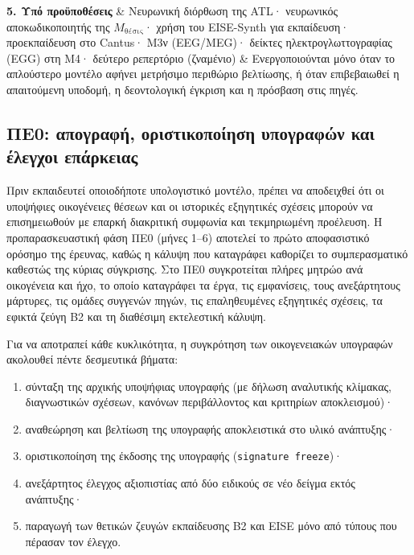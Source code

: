 \documentclass[11pt,a4paper]{article}
\begin{document}
\begin{longtable}[]
\textbf{5. Υπό προϋποθέσεις} & Νευρωνική διόρθωση της ATL· νευρωνικός αποκωδικοποιητής της \(M_{\text{θέσις}}\)· χρήση του EISE-Synth για εκπαίδευση· προεκπαίδευση στο Cantus· Μ3ν (EEG/MEG)· δείκτες ηλεκτρογλωττογραφίας (EGG) στη Μ4· δεύτερο ρεπερτόριο (ζναμένιο) & Ενεργοποιούνται μόνο όταν το απλούστερο μοντέλο αφήνει μετρήσιμο περιθώριο βελτίωσης, ή όταν επιβεβαιωθεί η απαιτούμενη υποδομή, η δεοντολογική έγκριση και η πρόσβαση στις πηγές. \\
\end{longtable}

\subsection{ΠΕ0: απογραφή, οριστικοποίηση υπογραφών και έλεγχοι επάρκειας}\label{ux3c0ux3b50-ux3b1ux3c0ux3bfux3b3ux3c1ux3b1ux3c6ux3ae-ux3c0ux3acux3b3ux3c9ux3bcux3b1-ux3c5ux3c0ux3bfux3b3ux3c1ux3b1ux3c6ux3ceux3bd-ux3baux3b1ux3b9-ux3c0ux3cdux3bbux3b5ux3c2-ux3b5ux3c0ux3acux3c1ux3baux3b5ux3b9ux3b1ux3c2}

Πριν εκπαιδευτεί οποιοδήποτε υπολογιστικό μοντέλο, πρέπει να αποδειχθεί ότι οι υποψήφιες οικογένειες θέσεων και οι ιστορικές εξηγητικές σχέσεις μπορούν να επισημειωθούν με επαρκή διακριτική συμφωνία και τεκμηριωμένη προέλευση. Η προπαρασκευαστική φάση ΠΕ0 (μήνες 1--6) αποτελεί το πρώτο αποφασιστικό ορόσημο της έρευνας, καθώς η κάλυψη που καταγράφει καθορίζει το συμπερασματικό καθεστώς της κύριας σύγκρισης. Στο ΠΕ0 συγκροτείται πλήρες μητρώο ανά οικογένεια και ήχο, το οποίο καταγράφει τα έργα, τις εμφανίσεις, τους ανεξάρτητους μάρτυρες, τις ομάδες συγγενών πηγών, τις επαληθευμένες εξηγητικές σχέσεις, τα εφικτά ζεύγη B2 και τη διαθέσιμη εκτελεστική κάλυψη.

Για να αποτραπεί κάθε κυκλικότητα, η συγκρότηση των οικογενειακών υπογραφών ακολουθεί πέντε δεσμευτικά βήματα:

\begin{enumerate}
\def\labelenumi{\arabic{enumi}.}
\item
  σύνταξη της αρχικής υποψήφιας υπογραφής (με δήλωση αναλυτικής κλίμακας, διαγνωστικών σχέσεων, κανόνων περιβάλλοντος και κριτηρίων αποκλεισμού)·
\item
  αναθεώρηση και βελτίωση της υπογραφής αποκλειστικά στο υλικό ανάπτυξης·
\item
  οριστικοποίηση της έκδοσης της υπογραφής (\texttt{signature\ freeze})·
\item
  ανεξάρτητος έλεγχος αξιοπιστίας από δύο ειδικούς σε νέο δείγμα εκτός ανάπτυξης·
\item
  παραγωγή των θετικών ζευγών εκπαίδευσης B2 και EISE μόνο από τύπους που πέρασαν τον έλεγχο.
\end{enumerate}
\end{document}

